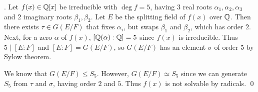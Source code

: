 \ex. Let \(f(x) \in \mathbb{Q}[x]\) be irreducible with \(\deg f = 5\), having \(3\) real roots \(\alpha_1, \alpha_2, \alpha_3\) and \(2\) imaginary roots \(\beta_1, \beta_2\). Let \(E\) be the splitting field of \(f(x)\) over \(\mathbb{Q}\). Then there exists \(\tau \in G(E/F)\) that fixes \(\alpha_i\), but swaps \(\beta_1\) and \(\beta_2\), which has order \(2\). Next, for a zero \(\alpha\) of \(f(x)\), \([\mathbb{Q}(\alpha) : \mathbb{Q}] = 5\) since \(f(x)\) is irreducible. Thus \(5 \mid [E : F]\) and \([E : F] = G(E/F)\), so \(G(E/F)\) has an element \(\sigma\) of order \(5\) by Sylow theorem.

We know that \(G(E/F) \leq S_5\). However, \(G(E/F) \simeq S_5\) since we can generate \(S_5\) from \(\tau\) and \(\sigma\), having order \(2\) and \(5\). Thus \(f(x)\) is not solvable by radicals. \qed

\pagebreak
